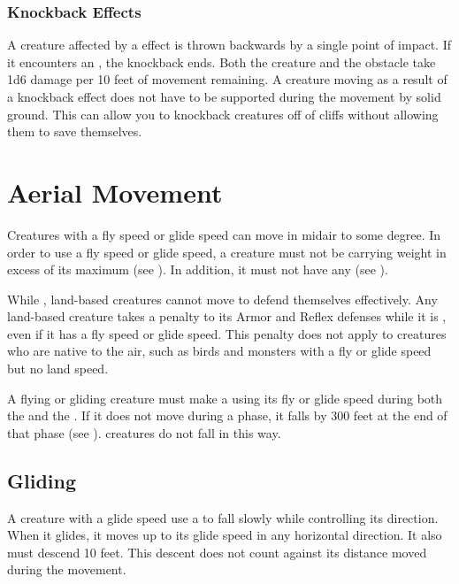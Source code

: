     \subsubsection{Knockback Effects}\label{Knockback Effects}
      A creature affected by a  effect is thrown backwards by a single point of impact.
      If it encounters an , the knockback ends.
      Both the creature and the obstacle take 1d6 damage per 10 feet of movement remaining.
      A creature moving as a result of a knockback effect does not have to be supported during the movement by solid ground.
      This can allow you to knockback creatures off of cliffs without allowing them to save themselves.

\section{Aerial Movement}\label{Aerial Movement}
  Creatures with a fly speed or glide speed can move in midair to some degree.
  In order to use a fly speed or glide speed, a creature must not be carrying weight in excess of its maximum  (see ).
  In addition, it must not have any  (see ).

  While , land-based creatures cannot move to defend themselves effectively.
  Any land-based creature takes a  penalty to its Armor and Reflex defenses while it is , even if it has a fly speed or glide speed.
  This penalty does not apply to creatures who are native to the air, such as birds and monsters with a fly or glide speed but no land speed.

  A flying or gliding creature must make a  using its fly or glide speed during both the  and the .
  If it does not move during a phase, it falls by 300 feet at the end of that phase (see ).
   creatures do not fall in this way.

  \subsection{Gliding}\label{Gliding}
    A creature with a glide speed use a  to fall slowly while controlling its direction.
    When it glides, it moves up to its glide speed in any horizontal direction.
    It also must descend 10 feet.
    This descent does not count against its distance moved during the movement.

